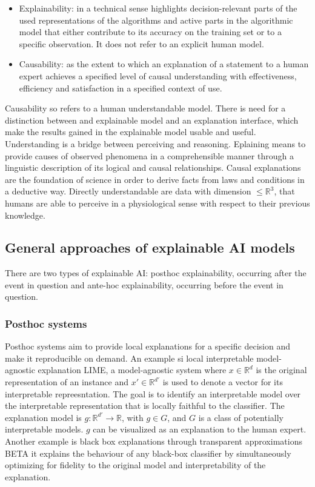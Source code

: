 	\begin{itemize}
		\item Explainability: in a technical sense highlights decision-relevant parts of the used representations of the algorithms and active parts in the algorithmic model that either contribute to its accuracy on the training set or to a specific observation.
			It does not refer to an explicit human model.
		\item Causability: as the extent to which an explanation of a statement to a human expert achieves a specified level of causal understanding with effectiveness, efficiency and satisfaction in a specified context of use.
	\end{itemize}

	Causability so refers to a human understandable model.
	There is need for a distinction between and explainable model and an explanation interface, which make the results gained in the explainable model usable and useful.
	Understanding is a bridge between perceiving and reasoning.
	Eplaining means to provide causes of observed phenomena in a comprehensible manner through a linguistic description of its logical and causal relationships.
	Causal explanations are the foundation of science in order to derive facts from laws and conditions in a deductive way.
	Directly understandable are data with dimension $\le\mathbb{R}^3$, that humans are able to perceive in a physiological sense with respect to their previous knowledge.

	\subsection{General approaches of explainable AI models}
	There are two types of explainable AI: posthoc explainability, occurring after the event in question and ante-hoc explainability, occurring before the event in question.


		\subsubsection{Posthoc systems}
		Posthoc systems aim to provide local explanations for a specific decision and make it reproducible on demand.
		An example si local interpretable model-agnostic explanation LIME, a model-agnostic system where $x\in\mathbb{R}^d$ is the original representation of an instance and $x'\in\mathbb{R}^{d'}$ is used to denote a vector for its interpretable repreesntation.
		The goal is to identify an interpretable model over the interpretable representation that is locally faithful to the classifier.
		The explanation model is $g:\mathbb{R}^{d'}\rightarrow\mathbb{R}$, with $g\in G$, and $G$ is a class of potentially interpretable models.
		$g$ can be visualized as an explanation to the human expert.
		Another example is black box explanations through transparent approximations BETA it explains the behaviour of any black-box classifier by simultaneously optimizing for fidelity to the original model and interpretability of the explanation.

